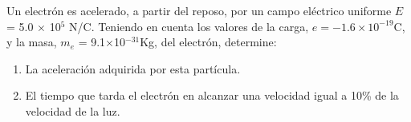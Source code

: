 Un electrón es acelerado, a partir del reposo, por un campo eléctrico uniforme $E$ = 5.0 $\times$ 10$^5$ N/C. Teniendo en cuenta los valores de la carga, $e = -1.6 \times 10^{-19}$C, y la masa, $m_e$ = 9.1$\times$10$^{-31}$Kg, del electrón, determine:
\begin{enumerate}
    \item La aceleración adquirida por esta partícula.
    \item El tiempo que tarda el electrón en alcanzar una velocidad igual a 10\% de la velocidad de la luz.
\end{enumerate}